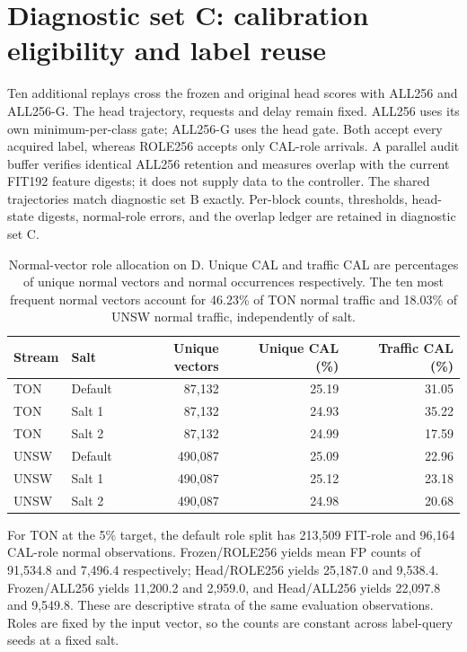 \section{Diagnostic set C: calibration eligibility and label reuse}
Ten additional replays cross the frozen and original head scores with ALL256 and ALL256-G. The head trajectory, requests and delay remain fixed. ALL256 uses its own minimum-per-class gate; ALL256-G uses the head gate. Both accept every acquired label, whereas ROLE256 accepts only CAL-role arrivals. A parallel audit buffer verifies identical ALL256 retention and measures overlap with the current FIT192 feature digests; it does not supply data to the controller. The shared trajectories match diagnostic set B exactly. Per-block counts, thresholds, head-state digests, normal-role errors, and the overlap ledger are retained in diagnostic set C.

\begin{table}[tb]
\centering\small\setlength{\tabcolsep}{4pt}
\caption{Normal-vector role allocation on D. Unique CAL and traffic CAL are percentages of unique normal vectors and normal occurrences respectively. The ten most frequent normal vectors account for 46.23\% of TON normal traffic and 18.03\% of UNSW normal traffic, independently of salt.}
\begin{tabular}{llrrr}\toprule
Stream & Salt & Unique vectors & Unique CAL (\%) & Traffic CAL (\%)\\\midrule
TON & Default & 87,132 & 25.19 & 31.05\\
TON & Salt 1 & 87,132 & 24.93 & 35.22\\
TON & Salt 2 & 87,132 & 24.99 & 17.59\\
UNSW & Default & 490,087 & 25.09 & 22.96\\
UNSW & Salt 1 & 490,087 & 25.12 & 23.18\\
UNSW & Salt 2 & 490,087 & 24.98 & 20.68\\
\bottomrule\end{tabular}
\end{table}

For TON at the 5\% target, the default role split has 213,509 FIT-role and 96,164 CAL-role normal observations. Frozen/ROLE256 yields mean FP counts of 91,534.8 and 7,496.4 respectively; Head/ROLE256 yields 25,187.0 and 9,538.4. Frozen/ALL256 yields 11,200.2 and 2,959.0, and Head/ALL256 yields 22,097.8 and 9,549.8. These are descriptive strata of the same evaluation observations. Roles are fixed by the input vector, so the counts are constant across label-query seeds at a fixed salt.

